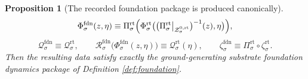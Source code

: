 \documentclass[11pt]{article}
\newcommand{\FoundSplit}[1]{\Phi_{#1}^{\mathrm{fdn}}}
\newcommand{\FoundCharge}[1]{\mathcal Q_{#1}^{\mathrm{fdn}}}
\newcommand{\FoundResidual}[1]{\mathcal R_{#1}^{\mathrm{fdn}}}
\newcommand{\FoundEmbed}[1]{\zeta_{#1}^{\mathrm{fdn}}}
\newcommand{\RootProj}[1]{\Pi_{#1}^{\mathrm{rt}}}
\newcommand{\RootZeroCore}[1]{\mathcal Z_{#1}^{0,\mathrm{rt}}}
\newcommand{\RootSplit}[1]{\Phi_{#1}^{\mathrm{rt}}}
\newcommand{\RootCharge}[1]{\mathcal Q_{#1}^{\mathrm{rt}}}
\newcommand{\RootEmbed}[1]{\zeta_{#1}^{\mathrm{rt}}}
\newtheorem{proposition}{Proposition}
\begin{document}
\begin{proposition}[The recorded foundation package is produced canonically]
\begin{equation}
\end{equation}
\begin{equation}
\FoundSplit{\sigma}(z,\eta)
\equiv
\RootProj{\sigma}\Bigl(
\RootSplit{\sigma}\bigl(
\bigl(\RootProj{\sigma}\big|_{\RootZeroCore{\sigma}}\bigr)^{-1}(z),
\eta
\bigr)
\Bigr),
\label{eq:inducedfoundsplit}
\end{equation}
\begin{equation}
\FoundCharge{\sigma}
\equiv
\RootCharge{\sigma},
\qquad
\FoundResidual{\sigma}\bigl(\FoundSplit{\sigma}(z,\eta)\bigr)
\equiv
\RootCharge{\sigma}(\eta),
\qquad
\FoundEmbed{\sigma}
\equiv
\RootProj{\sigma}\circ\RootEmbed{\sigma}.
\label{eq:inducedfoundhidden}
\end{equation}
Then the resulting data satisfy exactly the ground-generating substrate foundation dynamics package of Definition \ref{def:foundation}.
\end{proposition}
\end{document}
